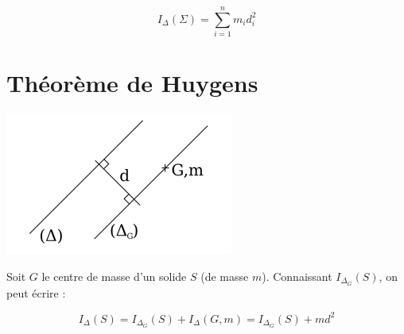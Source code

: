 \documentclass[a4paper, 11pt]{article}
\begin{document}
\[
I_\Delta(\Sigma) = \sum_{i=1}^nm_id_i^2
\]

\section{Théorème de Huygens}

\vfill
\begin{center}\includegraphics[scale=0.7]{i_delta2.png}\end{center}
\vfill

Soit $G$ le centre de masse d'un solide $S$ (de masse $m$). Connaissant $I_{\Delta_G}(S)$, on peut écrire :

\[
    I_{\Delta}(S) = I_{\Delta_G}(S) + I_\Delta(G,m) = I_{\Delta_G}(S) + md^2
\]
\end{document}
